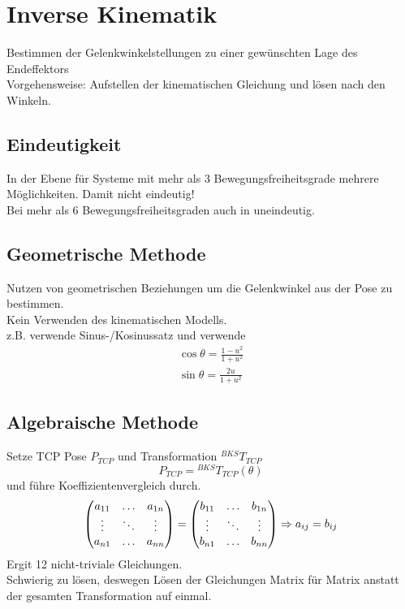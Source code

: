 

\section{Inverse Kinematik}
Bestimmen der Gelenkwinkelstellungen zu einer gewünschten Lage des Endeffektors\\
Vorgehensweise: Aufstellen der kinematischen Gleichung und lösen nach den Winkeln.

\subsection{Eindeutigkeit}
In der Ebene für Systeme mit mehr als 3 Bewegungsfreiheitsgrade mehrere Möglichkeiten. Damit nicht eindeutig!\\
Bei mehr als 6 Bewegungsfreiheitsgraden auch in \SE uneindeutig.

\subsection{Geometrische Methode}
Nutzen von geometrischen Beziehungen um die Gelenkwinkel aus der Pose zu bestimmen.\\
Kein Verwenden des kinematischen Modells.\\
z.B. verwende Sinus-/Kosinussatz und verwende
\begin{align*}
  \cos \theta = \frac{1 - u^2}{1 + u^2}\\
  \sin \theta = \frac{2u}{1 + u^2}
\end{align*}

\subsection{Algebraische Methode}
Setze TCP Pose \(P_{TCP}\) und Transformation \({}^{BKS}T_{TCP}\)
\[P_{TCP} = {}^{BKS}T_{TCP}(\theta)\]
und führe Koeffizientenvergleich durch.
\[\begin{pmatrix}a_{11} & \dots & a_{1n}\\ \vdots & \ddots & \vdots \\ a_{n1} & \dots & a_{nn} \end{pmatrix} =
  \begin{pmatrix}b_{11} & \dots & b_{1n}\\ \vdots & \ddots & \vdots \\ b_{n1} & \dots & b_{nn} \end{pmatrix} \Rightarrow a_{ij} = b_{ij}\]
Ergit 12 nicht-triviale Gleichungen.\\
Schwierig zu lösen, deswegen Lösen der Gleichungen Matrix für Matrix anstatt der gesamten Transformation auf einmal.


